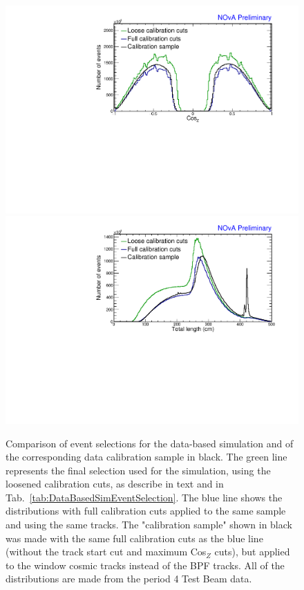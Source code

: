 \begin{figure}[!h]
\includegraphics[clip, width=\textwidth]{Plots/TBCalibration/DBSim_SelectionComparisonPCHitsListCut_CosZ.pdf}
\includegraphics[clip, width=\textwidth]{Plots/TBCalibration/DBSim_SelectionComparisonPCHitsListCut_TotLength.pdf}
\caption[Event selection for the data-based simulation]{Comparison of event selections for the data-based simulation and of the corresponding data calibration sample in black. The green line represents the final selection used for the simulation, using the loosened calibration cuts, as describe in text and in Tab.~\ref{tab:DataBasedSimEventSelection}. The blue line shows the distributions with full calibration cuts applied to the same sample and using the same tracks. The "calibration sample" shown in black was made with the same full calibration cuts as the blue line (without the track start cut and maximum Cos$_Z$ cuts), but applied to the window cosmic tracks instead of the \acrshort{BPF} tracks. All of the distributions are made from the period 4 Test Beam data.}
\label{figPCHitsListCutsComparison}
\end{figure}

